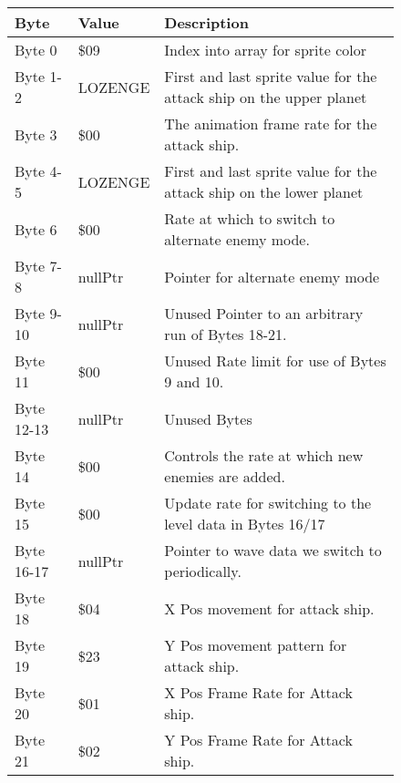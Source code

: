 \begin{figure}[H]
{\begin{adjustbox}{width=12cm}
\begin{tabular}{lll}
\toprule
 Byte       & Value                     & Description                                                         \\
\midrule
 Byte 0     & \$09                       & Index into array for sprite color                                   \\
 Byte 1-2   & LOZENGE                   & First and last sprite value for the attack ship on the upper planet \\
 Byte 3     & \$00                       & The animation frame rate for the attack ship.                       \\
 Byte 4-5   & LOZENGE                   & First and last sprite value for the attack ship on the lower planet \\
 Byte 6     & \$00                       & Rate at which to switch to alternate enemy mode.                    \\
 Byte 7-8   & nullPtr                   & Pointer for alternate enemy mode                                    \\
 Byte 9-10  & nullPtr                   & Unused Pointer to an arbitrary run of Bytes 18-21.                  \\
 Byte 11    & \$00                       & Unused Rate limit for use of Bytes 9 and 10.                        \\
 Byte 12-13 & nullPtr                   & Unused Bytes                                                        \\
 Byte 14    & \$00                       & Controls the rate at which new enemies are added.                   \\
 Byte 15    & \$00                       & Update rate for switching to the level data in Bytes 16/17          \\
 Byte 16-17 & nullPtr                   & Pointer to wave data we switch to periodically.                     \\
 Byte 18    & \$04                       & X Pos movement for attack ship.                                     \\
 Byte 19    & \$23                       & Y Pos movement pattern for attack ship.                             \\
 Byte 20    & \$01                       & X Pos Frame Rate for Attack ship.                                   \\
 Byte 21    & \$02                       & Y Pos Frame Rate for Attack ship.                                   \\

\end{tabular}
\end{adjustbox}}
\end{figure}
